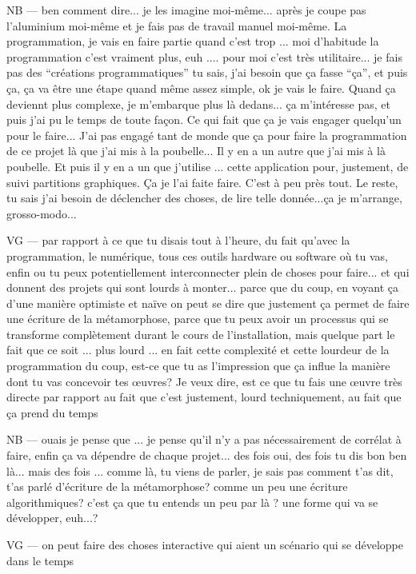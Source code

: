 NB —  ben comment dire... je les imagine moi-même... après je coupe pas l'aluminium moi-même et je fais pas de travail manuel moi-même. La programmation, je vais en faire partie quand c'est trop ... moi d'habitude la programmation c'est vraiment plus, euh .... pour moi c'est très utilitaire... je fais pas des ``créations programmatiques'' tu sais, j'ai besoin que ça fasse ``ça'', et puis ça, ça va être une étape quand même assez simple, ok je vais le faire. Quand ça deviennt plus complexe, je m'embarque plus là dedans... ça m'intéresse pas, et puis j'ai pu le temps de toute façon. Ce qui fait que ça je vais engager quelqu'un pour le faire... J'ai pas engagé tant de monde que ça pour faire la programmation de ce projet là que j'ai mis à la poubelle... Il y en a un autre que j'ai mis à là poubelle. Et puis il y en a un que j'utilise ... cette application pour, justement, de suivi partitions graphiques. Ça je l'ai faite faire. C'est à peu près tout. Le reste, tu sais j'ai besoin de déclencher des choses, de lire telle donnée...ça je m'arrange, grosso-modo...

VG — par rapport à ce que tu disais tout à l'heure, du fait qu'avec la programmation, le numérique, tous ces outils hardware ou software où tu vas, enfin ou tu peux potentiellement interconnecter plein de choses pour faire...  et qui donnent des projets qui sont lourds à monter... parce que du coup, en voyant ça d'une manière optimiste et naïve on peut se dire que justement ça permet de faire une écriture de la métamorphose, parce que tu peux avoir un processus qui se transforme complètement durant le cours de l'installation, mais quelque part le fait que ce soit ... plus lourd ... en fait cette complexité et cette lourdeur de la programmation du coup, est-ce que tu as l'impression que ça influe la manière dont tu vas concevoir tes œuvres? 
Je veux dire, est ce que tu fais une œuvre très directe par rapport au fait que c'est justement, lourd techniquement, au fait que ça prend du temps

NB — ouais je pense que ... je pense qu'il n'y a pas nécessairement de corrélat à faire, enfin ça va dépendre de chaque projet... des fois oui, des fois tu dis bon ben là... mais des fois ... comme là, tu viens de parler, je sais pas comment t'as dit, t'as parlé d'écriture de la métamorphose? comme un peu une écriture algorithmiques? c'est ça que tu entends un peu par là ?  une forme qui va se développer, euh...? 

VG — on peut faire des choses interactive qui aient un scénario qui se développe dans le temps 


